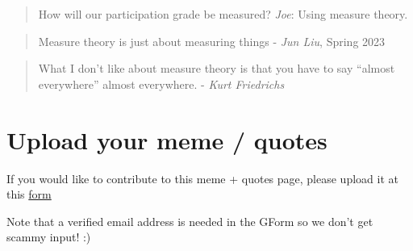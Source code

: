 \documentclass[
  letterpaper,
  DIV=11,
  numbers=noendperiod]{scrreprt}
\theoremstyle{definition}
\theoremstyle{plain}
\theoremstyle{remark}
\begin{document}

\begin{quote}
How will our participation grade be measured? \emph{Joe}: Using measure
theory.
\end{quote}

\begin{quote}
Measure theory is just about measuring things - \emph{Jun Liu}, Spring
2023
\end{quote}

\begin{quote}
What I don't like about measure theory is that you have to say ``almost
everywhere'' almost everywhere. - \emph{Kurt Friedrichs}
\end{quote}

\hypertarget{upload-your-meme-quotes}{%
\section*{Upload your meme / quotes}\label{upload-your-meme-quotes}}


If you would like to contribute to this meme + quotes page, please
upload it at this \href{https://forms.gle/RBmMNYJp4u3qD5W79}{form}

Note that a verified email address is needed in the GForm so we don't
get scammy input! :)

\(\,\)
\end{document}
